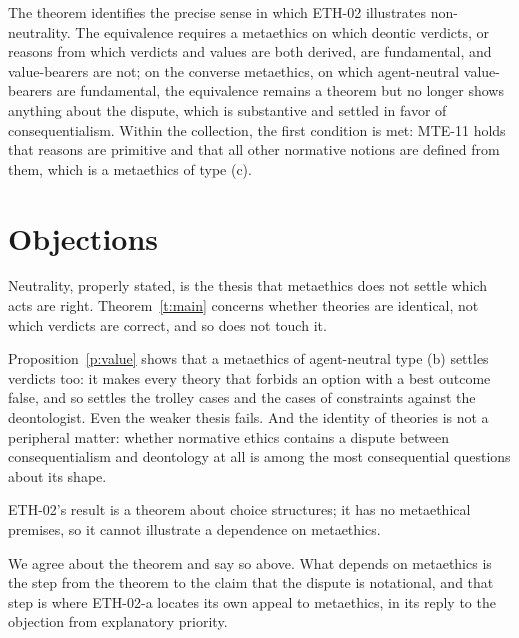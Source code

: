 \documentclass{situationist-preprint}
\begin{document}
The theorem identifies the precise sense in which ETH-02 illustrates non-neutrality. The equivalence requires a metaethics on which deontic verdicts, or reasons from which verdicts and values are both derived, are fundamental, and value-bearers are not; on the converse metaethics, on which agent-neutral value-bearers are fundamental, the equivalence remains a theorem but no longer shows anything about the dispute, which is substantive and settled in favor of consequentialism. Within the collection, the first condition is met: MTE-11 holds that reasons are primitive and that all other normative notions are defined from them, which is a metaethics of type (c).

\section{Objections}

\begin{objection}
Neutrality, properly stated, is the thesis that metaethics does not settle which acts are right. Theorem~\ref{t:main} concerns whether theories are identical, not which verdicts are correct, and so does not touch it.
\end{objection}

\begin{reply}
Proposition~\ref{p:value} shows that a metaethics of agent-neutral type (b) settles verdicts too: it makes every theory that forbids an option with a best outcome false, and so settles the trolley cases and the cases of constraints against the deontologist. Even the weaker thesis fails. And the identity of theories is not a peripheral matter: whether normative ethics contains a dispute between consequentialism and deontology at all is among the most consequential questions about its shape.
\end{reply}

\begin{objection}
ETH-02's result is a theorem about choice structures; it has no metaethical premises, so it cannot illustrate a dependence on metaethics.
\end{objection}

\begin{reply}
We agree about the theorem and say so above. What depends on metaethics is the step from the theorem to the claim that the dispute is notational, and that step is where ETH-02-a locates its own appeal to metaethics, in its reply to the objection from explanatory priority.
\end{reply}
\end{document}
